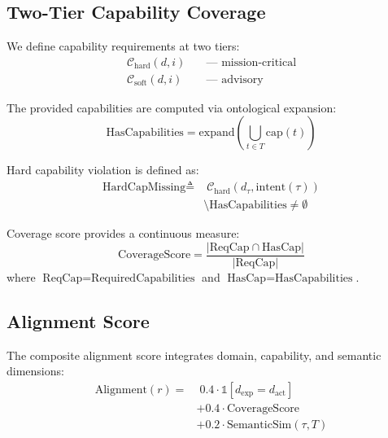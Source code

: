 \documentclass[10pt,a4paper,twocolumn]{article}
\begin{document}
\subsection{Two-Tier Capability Coverage}
\label{sec:capability}

We define capability requirements at two tiers:
\begin{align}
\mathcal{C}_{\text{hard}}(d, i) &\quad \text{--- mission-critical} \\
\mathcal{C}_{\text{soft}}(d, i) &\quad \text{--- advisory}
\end{align}

The provided capabilities are computed via ontological expansion:
\begin{equation}
\text{HasCapabilities} = \text{expand}\left(\bigcup_{t \in T} \text{cap}(t)\right)
\end{equation}

Hard capability violation is defined as:
\begin{equation}
\begin{split}
\text{HardCapMissing} \triangleq & \; \mathcal{C}_{\text{hard}}(d_\tau, \text{intent}(\tau)) \\
& \setminus \text{HasCapabilities} \neq \emptyset
\end{split}
\end{equation}

Coverage score provides a continuous measure:
\begin{equation}
\text{CoverageScore} = \frac{|\text{ReqCap} \cap \text{HasCap}|}{|\text{ReqCap}|}
\end{equation}
where $\text{ReqCap} = \text{RequiredCapabilities}$ and $\text{HasCap} = \text{HasCapabilities}$.

\subsection{Alignment Score}
\label{sec:alignment}

The composite alignment score integrates domain, capability, and semantic dimensions:
\begin{equation}
\begin{split}
\text{Alignment}(r) = & \; 0.4 \cdot \mathbb{1}[d_{\text{exp}} = d_{\text{act}}] \\
& + 0.4 \cdot \text{CoverageScore} \\
& + 0.2 \cdot \text{SemanticSim}(\tau, T)
\end{split}
\label{eq:alignment}
\end{equation}
\end{document}
